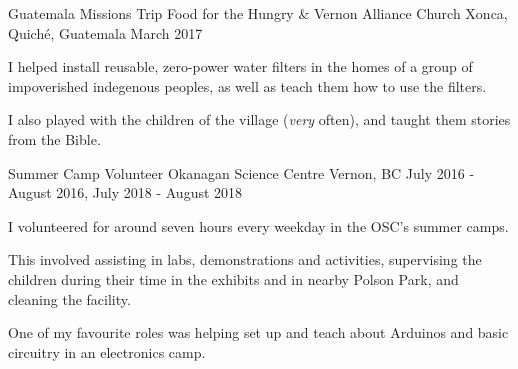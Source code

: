 \begin{cventries}
  \cventry
    {Guatemala Missions Trip} %
    {Food for the Hungry \& Vernon Alliance Church} %
    {Xonca, Quiché, Guatemala} %
    {March 2017} %
    {
      \begin{cvitems} %
        \item{I helped install reusable, zero-power water filters in the homes of a group of impoverished indegenous peoples, as well as teach them how to use the filters.}
        \item{I also played with the children of the village (\textit{very} often), and taught them stories from the Bible.}
      \end{cvitems}
    }

  \cventry
    {Summer Camp Volunteer} %
    {Okanagan Science Centre} %
    {Vernon, BC} %
    {July 2016 - August 2016, July 2018 - August 2018} %
    {
      \begin{cvitems} %
        \item{I volunteered for around seven hours every weekday in the OSC's summer camps.}
        \item{This involved assisting in labs, demonstrations and activities, supervising the children during their time in the exhibits and in nearby Polson Park, and cleaning the facility.}
        \item{One of my favourite roles was helping set up and teach about Arduinos and basic circuitry in an electronics camp.}
      \end{cvitems}
    }

\end{cventries}
